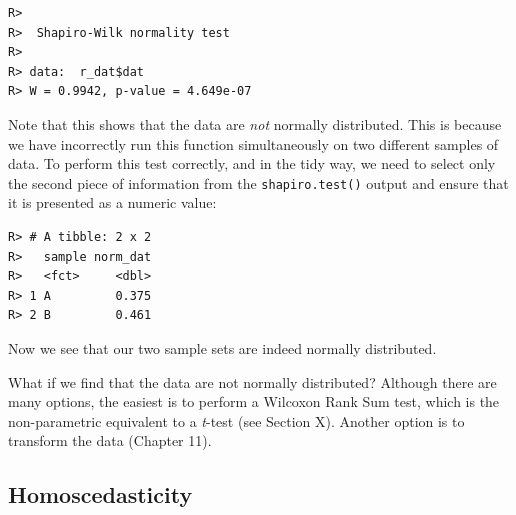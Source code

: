 \documentclass[english,10pt,a4paper,oneside]{book}
\newenvironment{Shaded}{\begin{snugshade}}{\end{snugshade}}
\newcommand{\CommentTok}[1]{\textcolor[rgb]{0.56,0.35,0.01}{\textit{#1}}}
\newcommand{\DataTypeTok}[1]{\textcolor[rgb]{0.13,0.29,0.53}{#1}}
\newcommand{\DecValTok}[1]{\textcolor[rgb]{0.00,0.00,0.81}{#1}}
\newcommand{\KeywordTok}[1]{\textcolor[rgb]{0.13,0.29,0.53}{\textbf{#1}}}
\newcommand{\NormalTok}[1]{#1}
\newcommand{\OperatorTok}[1]{\textcolor[rgb]{0.81,0.36,0.00}{\textbf{#1}}}
\newcommand{\StringTok}[1]{\textcolor[rgb]{0.31,0.60,0.02}{#1}}
\theoremstyle{definition}
\theoremstyle{definition}
\theoremstyle{definition}
\theoremstyle{remark}
\begin{document}
\begin{Shaded}
\end{Shaded}

\begin{verbatim}
R> 
R>  Shapiro-Wilk normality test
R> 
R> data:  r_dat$dat
R> W = 0.9942, p-value = 4.649e-07
\end{verbatim}

Note that this shows that the data are \emph{not} normally distributed.
This is because we have incorrectly run this function simultaneously on
two different samples of data. To perform this test correctly, and in
the tidy way, we need to select only the second piece of information
from the \texttt{shapiro.test()} output and ensure that it is presented
as a numeric value:

\begin{Shaded}
\end{Shaded}

\begin{verbatim}
R> # A tibble: 2 x 2
R>   sample norm_dat
R>   <fct>     <dbl>
R> 1 A         0.375
R> 2 B         0.461
\end{verbatim}

Now we see that our two sample sets are indeed normally distributed.

What if we find that the data are not normally distributed? Although
there are many options, the easiest is to perform a Wilcoxon Rank Sum
test, which is the non-parametric equivalent to a \emph{t}-test (see
Section X). Another option is to transform the data (Chapter 11).

\hypertarget{homoscedasticity}{%
\subsection{Homoscedasticity}\label{homoscedasticity}}
\end{document}

